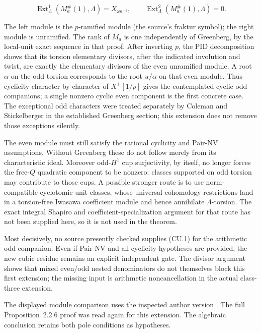 \[
\operatorname{Ext}^1_\Lambda(M_a^\#(1),\Lambda)
   =X_{\omega a^{-1}},
\qquad
\operatorname{Ext}^2_\Lambda(M_a^\#(1),\Lambda)=0.
\]

The left module is the \(p\)-ramified module (the source's fraktur symbol); the right module is unramified. The rank of \(M_a\) is one independently of Greenberg, by the local-unit exact sequence in that proof. After inverting \(p\), the PID decomposition shows that its torsion elementary divisors, after the indicated involution and twist, are exactly the elementary divisors of the even unramified module. A root \(\alpha\) on the odd torsion corresponds to the root \(u/\alpha\) on that even module. Thus cyclicity character by character of \(X^+[1/p]\) gives the contemplated cyclic odd companions; a single nonzero cyclic even component is the first concrete case. The exceptional odd characters were treated separately by Coleman and Stickelberger in the established Greenberg section; this extension does not remove those exceptions silently.

The even module must still satisfy the rational cyclicity and Pair-NV assumptions. Without Greenberg these do not follow merely from its characteristic ideal. Moreover odd-\(H^1\) cup surjectivity, by itself, no longer forces the free-\(Q\) quadratic component to be nonzero: classes supported on odd torsion may contribute to those cups. A possible stronger route is to use norm-compatible cyclotomic-unit classes, whose universal cohomology restrictions land in a torsion-free Iwasawa coefficient module and hence annihilate \(\Lambda\)-torsion. The exact integral Shapiro and coefficient-specialization argument for that route has not been supplied here, so it is not used in the theorem.

Most decisively, no source presently checked supplies (CU.1) for the arithmetic odd companion. Even if Pair-NV and all cyclicity hypotheses are provided, the new cubic residue remains an explicit independent gate. The divisor argument shows that mixed even/odd nested denominators do not themselves block this first extension; the missing input is arithmetic noncancellation in the actual class-three extension.

The displayed module comparison uses the inspected author version \cite{WakeWangErickson2017}. The full Proposition~2.2.6 proof was read again for this extension. The algebraic conclusion retains both pole conditions as hypotheses.
